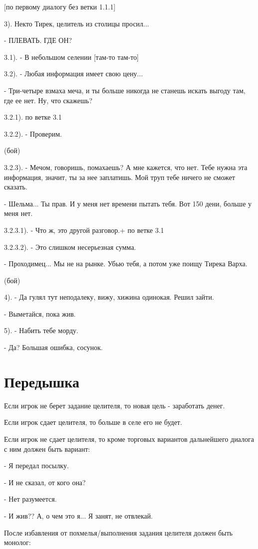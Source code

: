 \documentclass[12pt,a4paper]{book}
\begin{document}
[по первому диалогу без ветки 1.1.1]

3). Некто Тирек, целитель из столицы просил...

- ПЛЕВАТЬ. ГДЕ ОН?

3.1). - В небольшом селении [там-то там-то]

3.2). - Любая информация имеет свою цену...

- Три-четыре взмаха меча, и ты больше никогда не станешь искать выгоду там, где ее нет. Ну, что скажешь?

3.2.1). по ветке 3.1

3.2.2). - Проверим.

(бой)

3.2.3). - Мечом, говоришь, помахаешь? А мне кажется, что нет. Тебе нужна эта информация, значит, ты за нее заплатишь. Мой труп тебе ничего не сможет сказать.

- Шельма... Ты прав. И у меня нет времени пытать тебя. Вот 150 дени, больше у меня нет.

3.2.3.1). - Что ж, это другой разговор.+ по ветке 3.1

3.2.3.2). - Это слишком несерьезная сумма.

- Проходимец... Мы не на рынке. Убью тебя, а потом уже поищу Тирека Варха.

(бой)  

4). - Да гулял тут неподалеку, вижу, хижина одинокая. Решил зайти.

- Выметайся, пока жив.

5). - Набить тебе морду.

- Да? Большая ошибка, сосунок.

\section{Передышка}

Если игрок не берет задание целителя, то новая цель - заработать денег.

Если игрок сдает целителя, то больше в селе его не будет.

Если игрок не сдает целителя, то кроме торговых вариантов дальнейшего диалога с ним должен быть вариант:

- Я передал посылку.

- И не сказал, от кого она?

- Нет разумеется.

- И жив?? А, о чем это я... Я занят, не отвлекай.

После избавления от похмелья/выполнения задания целителя должен быть монолог:
\end{document}

